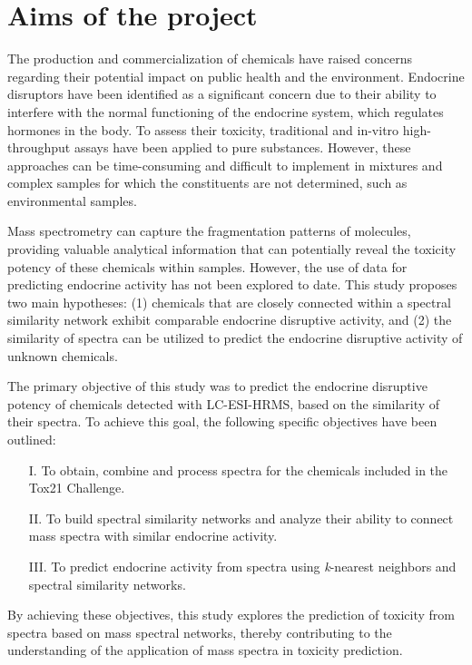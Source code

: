 \chapter{Aims of the project}

The production and commercialization of chemicals have raised concerns regarding their potential impact on public health and the environment. Endocrine disruptors have been identified as a significant concern due to their ability to interfere with the normal functioning of the endocrine system, which regulates hormones in the body. To assess their toxicity, traditional and in-vitro high-throughput assays have been applied to pure substances. However, these approaches can be time-consuming and difficult to implement in mixtures and complex samples for which the constituents are not determined, such as environmental samples.
 
Mass spectrometry can capture the fragmentation patterns of molecules, providing valuable analytical information that can potentially reveal the toxicity potency of these chemicals within samples. However, the use of \tMS{} data for predicting endocrine activity has not been explored to date. This study proposes two main hypotheses: (1) chemicals that are closely connected within a spectral similarity network exhibit comparable endocrine disruptive activity, and (2) the similarity of \tMS{} spectra can be utilized to predict the endocrine disruptive activity of unknown chemicals.

The primary objective of this study was to predict the endocrine disruptive potency of chemicals detected with LC-ESI-HRMS, based on the similarity of their \tMS{} spectra. To achieve this goal, the following specific objectives have been outlined:

\begin{enumerate}
\item[\hspace{1cm}I.]  To obtain, combine and process \tMS{} spectra for the chemicals included in the Tox21 Challenge.
\item[\hspace{1cm}II.] To build spectral similarity networks and analyze their ability to connect mass spectra with similar endocrine activity.
\item[\hspace{1cm}III.] To predict endocrine activity from \tMS{} spectra using \textit{k}-nearest neighbors and spectral similarity networks.
\end{enumerate}

By achieving these objectives, this study explores the prediction of toxicity from \tMS{} spectra based on mass spectral networks, thereby contributing to the understanding of the application of mass spectra in toxicity prediction.



